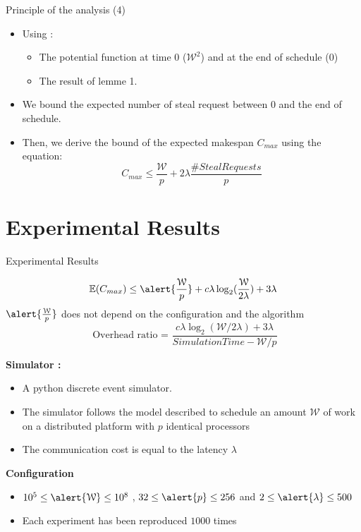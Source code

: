 \documentclass{beamer}
\begin{document}
    \begin{frame}{Principle of the analysis (4)}

        \begin{itemize}
            \item Using :
        \begin{itemize}
            \item The potential function at time 0 \alert{($\mathcal{W}^2$)} and at the end of schedule \alert{(0)}
            \item The result of lemme 1.
        \end{itemize}
    \item We bound the expected number of steal request between $0$ and the end of schedule.
                
    \item Then, we derive the bound of the expected makespan $C_{max}$ using the equation:
        \begin{equation*}
            C_{max}  \leq \frac{\mathcal{W}}{p} + 2\lambda\frac{\#StealRequests}{p}
        \end{equation*} 
        \end{itemize}
\end{frame}

\section{Experimental Results}
\begin{frame}{Experimental Results}

        \begin{equation*}   
            \mathbb{E}(C_{max}) \leq \alert{\frac{\mathcal{W}}{p}} +  c\lambda\log_2(\frac{\mathcal{W}}{2\lambda}) + 3\lambda
        \end{equation*}             
       $ \alert{\frac{\mathcal{W}}{p}} $ \alert{does not depend on the configuration and the algorithm }
\pause
    \begin{equation*}
        \text{ Overhead ratio = } \frac{c\lambda\log_2(\mathcal{W}/2\lambda) + 3\lambda}{Simulation Time - \mathcal{W}/p} 
    \end{equation*}
\pause

    \textbf{Simulator : }
    \begin{itemize}
        \item A python discrete event simulator.
        \item The simulator follows the model described to schedule an amount $\mathcal{W}$ of work on a distributed platform with $p$ identical processors 
        \item The communication cost is equal to the latency $\lambda$
    \end{itemize}
    \textbf{Configuration}
    \begin{itemize}
        \item  $ 10^5 \leq \alert{\mathcal{W}} \leq 10^8$
            , $ 32 \leq \alert{p} \leq 256$ and  
            $ 2 \leq \alert{\lambda} \leq 500$ 
        \item Each experiment has been reproduced \alert{$1000$} times
    \end{itemize}
\end{frame}
\end{document}
